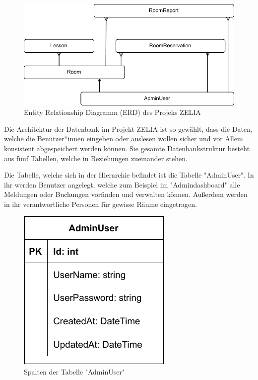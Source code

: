 
\begin{figure}[H]
    \centering
    \includegraphics{media/MariaDB/ERD.svg.pdf}
    \caption{Entity Relationship Diagramm (ERD) des Projeks ZELIA}
\end{figure}

Die Architektur der Datenbank im Projekt ZELIA ist so gewählt, dass die Daten, welche die Benutzer*innen eingeben oder auslesen wollen sicher und vor Allem konsistent abgespeichert werden können. Sie gesamte Datenbankstruktur besteht aus fünf Tabellen, welche in Beziehungen zueinander stehen.


Die Tabelle, welche sich in der Hierarchie befindet ist die Tabelle "AdminUser". In ihr werden Benutzer angelegt, welche zum Beispiel im "Admindashboard" alle Meldungen oder Buchungen vorfinden und verwalten können. Außerdem werden in ihr verantwortliche Personen für gewisse Räume eingetragen.

\begin{figure}[H]
    \centering
    \includegraphics{media/MariaDB/AdminUser.svg.pdf}
    \caption{Spalten der Tabelle "AdminUser"}
\end{figure}

